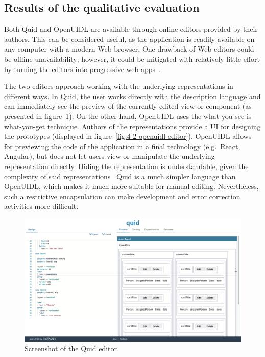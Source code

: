 \subsection{Results of the qualitative evaluation}\label{subsec:results-of-the-qualitative-evaluation}
Both Quid and OpenUIDL are available through online editors provided by their authors.
This can be considered useful, as the application is readily available on any computer with a modern Web browser.
One drawback of Web editors could be offline unavailability;
however, it could be mitigated with relatively little effort by turning the editors into progressive web apps~.

The two editors approach working with the underlying representations in different ways.
In Quid, the user works directly with the description language and can immediately see the preview of the currently edited view or component (as presented in figure~\ref{fig:4-2-quid-editor}).
On the other hand, OpenUIDL uses the what-you-see-is-what-you-get technique.
Authors of the representations provide a UI for designing the prototypes (displayed in figure~\ref{fig:4-2-openuidl-editor}).
OpenUIDL allows for previewing the code of the application in a final technology (e.g.\ React, Angular), but does not let users view or manipulate the underlying representation directly.
Hiding the representation is understandable, given the complexity of said representations \textendash\ Quid is a much simpler language than OpenUIDL, which makes it much more suitable for manual editing.
Nevertheless, such a restrictive encapsulation can make development and error correction activities more difficult.

\begin{figure}
    \centering
    \includegraphics[width=\textwidth]{4-results-and-discussion/quid-editor}
    \caption{Screenshot of the Quid editor}
    \label{fig:4-2-quid-editor}
\end{figure}

